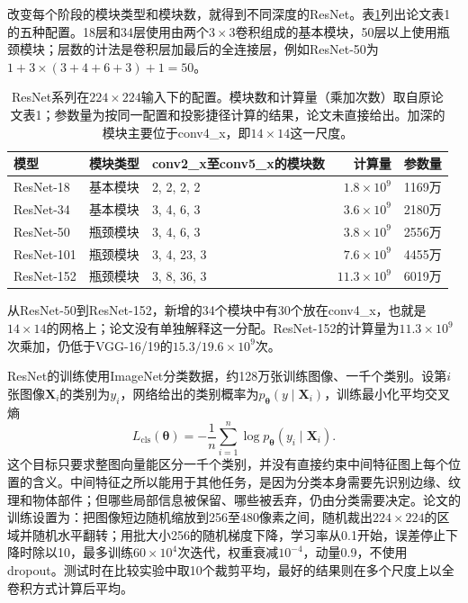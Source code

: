 改变每个阶段的模块类型和模块数，就得到不同深度的ResNet。表\ref{tab:vision-ivm-resnet-family}列出论文表1的五种配置。18层和34层使用由两个$3\times3$卷积组成的基本模块，50层以上使用瓶颈模块；层数的计法是卷积层加最后的全连接层，例如ResNet-50为$1+3\times(3+4+6+3)+1=50$。

\begin{table}[tbp]
  \centering
  \small
  \begin{tabular}{@{}lllrr@{}}
    \toprule
    模型 & 模块类型 & conv2\_x至conv5\_x的模块数 & 计算量 & 参数量\\
    \midrule
    ResNet-18 & 基本模块 & 2, 2, 2, 2 & $1.8\times10^9$ & 1169万\\
    ResNet-34 & 基本模块 & 3, 4, 6, 3 & $3.6\times10^9$ & 2180万\\
    ResNet-50 & 瓶颈模块 & 3, 4, 6, 3 & $3.8\times10^9$ & 2556万\\
    ResNet-101 & 瓶颈模块 & 3, 4, 23, 3 & $7.6\times10^9$ & 4455万\\
    ResNet-152 & 瓶颈模块 & 3, 8, 36, 3 & $11.3\times10^9$ & 6019万\\
    \bottomrule
  \end{tabular}
  \caption{ResNet系列在$224\times224$输入下的配置。模块数和计算量（乘加次数）取自原论文表1；参数量为按同一配置和投影捷径计算的结果，论文未直接给出。加深的模块主要位于conv4\_x，即$14\times14$这一尺度。}
  \label{tab:vision-ivm-resnet-family}
\end{table}

从ResNet-50到ResNet-152，新增的34个模块中有30个放在conv4\_x，也就是$14\times14$的网格上；论文没有单独解释这一分配。ResNet-152的计算量为$11.3\times10^9$次乘加，仍低于VGG-16/19的$15.3/19.6\times10^9$次。

ResNet的训练使用ImageNet分类数据，约128万张训练图像、一千个类别。设第$i$张图像$\bm X_i$的类别为$y_i$，网络给出的类别概率为$p_{\bm\theta}(y\mid\bm X_i)$，训练最小化平均交叉熵
\begin{equation}
  L_{\mathrm{cls}}(\bm\theta)=-\frac{1}{n}\sum_{i=1}^{n}\log p_{\bm\theta}(y_i\mid\bm X_i).
  \label{eq:vision-ivm-cls-loss}
\end{equation}
这个目标只要求整图向量能区分一千个类别，并没有直接约束中间特征图上每个位置的含义。中间特征之所以能用于其他任务，是因为分类本身需要先识别边缘、纹理和物体部件；但哪些局部信息被保留、哪些被丢弃，仍由分类需要决定。论文的训练设置为：把图像短边随机缩放到256至480像素之间，随机裁出$224\times224$的区域并随机水平翻转；用批大小256的随机梯度下降，学习率从0.1开始，误差停止下降时除以10，最多训练$60\times10^4$次迭代，权重衰减$10^{-4}$，动量0.9，不使用dropout。测试时在比较实验中取10个裁剪平均，最好的结果则在多个尺度上以全卷积方式计算后平均。

